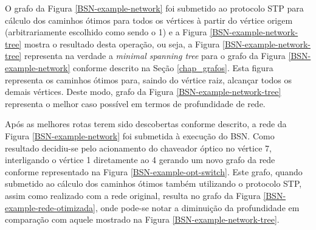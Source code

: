 O grafo da Figura \ref{BSN-example-network} foi submetido ao protocolo STP para cálculo dos caminhos ótimos para todos os vértices à partir do vértice origem (arbitrariamente escolhido como sendo o 1) e a Figura \ref{BSN-example-network-tree} mostra o resultado desta operação, ou seja, a Figura \ref{BSN-example-network-tree} representa na verdade a \emph{minimal spanning tree} para o grafo da Figura \ref{BSN-example-network} conforme descrito na Seção \ref{chap_grafos}. Esta figura representa os caminhos ótimos para, saindo do vértice raiz, alcançar todos os demais vértices. Deste modo, grafo da Figura \ref{BSN-example-network-tree} representa o melhor caso possível em termos de profundidade de rede.

Após as melhores rotas terem sido descobertas conforme descrito, a rede da Figura \ref{BSN-example-network} foi submetida à execução do BSN. Como resultado decidiu-se pelo acionamento do chaveador óptico no vértice 7, interligando o vértice 1 diretamente ao 4 gerando um novo grafo da rede conforme representado na Figura \ref{BSN-example-opt-switch}. Este grafo, quando submetido ao cálculo dos caminhos ótimos também utilizando o protocolo STP, assim como realizado com a rede original, resulta no grafo da Figura \ref{BSN-example-rede-otimizada}, onde pode-se notar a diminuição da profundidade em comparação com aquele mostrado na Figura \ref{BSN-example-network-tree}.

